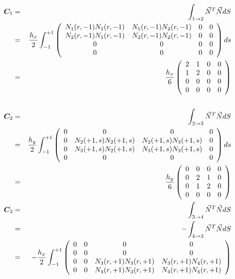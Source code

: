 \begin{eqnarray}
{\bm C}_{1} 
&=& \int_{1\rightarrow 2} \vec{N}^T \vec{N} dS  \nn\\
&=& 
\frac{h_x}{2}
\int_{-1}^{+1}  
\left(\begin{array}{cccc}
N_1(r,-1)N_1(r,-1) & N_1(r,-1) N_2(r,-1) & 0 & 0 \\
N_2(r,-1)N_1(r,-1) & N_2(r,-1) N_2(r,-1) & 0 & 0 \\
0 & 0 & 0 & 0 \\
0 & 0 & 0 & 0 
\end{array}\right)
ds \nn\\
&=&
\frac{h_x}{6}
\left(\begin{array}{cccc}
2 & 1 & 0 & 0 \\
1 & 2 & 0 & 0 \\
0 & 0 & 0 & 0 \\
0 & 0 & 0 & 0 
\end{array}\right)
\nn\\
\nn\\
{\bm C}_{2} 
&=& \int_{2\rightarrow 3} \vec{N}^T \vec{N} dS  \nn\\
&=& 
\frac{h_y}{2}
\int_{-1}^{+1}  
\left(\begin{array}{cccc}
0 & 0 & 0 & 0 \\
0 & N_2(+1,s)N_2(+1,s) & N_2(+1,s) N_3(+1,s) &0\\
0 & N_3(+1,s)N_2(+1,s) & N_3(+1,s) N_3(+1,s) &0\\
0 & 0 & 0 & 0 
\end{array}\right)
ds 
\nn\\
&=&
\frac{h_y}{6}
\left(\begin{array}{cccc}
0 & 0 & 0 & 0 \\
0 & 2 & 1 & 0 \\
0 & 1 & 2 & 0 \\
0 & 0 & 0 & 0 
\end{array}\right)
\nn\\
{\bm C}_{3}
&=& \int_{3\rightarrow 4} \vec{N}^T \vec{N} dS \nn\\
&=& -\int_{4\rightarrow 3} \vec{N}^T \vec{N} dS \nn\\
&=& 
-\frac{h_x}{2}
\int_{-1}^{+1}  
\left(\begin{array}{cccc}
0 & 0 & 0 & 0 \\
0 & 0 & 0 & 0 \\ 
0 & 0 & N_3(r,+1)N_3(r,+1) & N_3(r,+1) N_4(r,+1) \\
0 & 0 & N_4(r,+1)N_3(r,+1) & N_4(r,+1) N_4(r,+1)
\end{array}\right)

\end{eqnarray}
